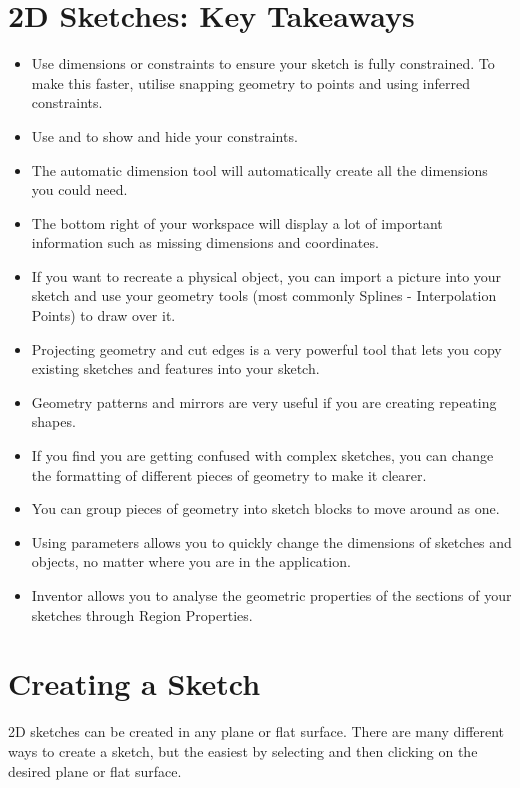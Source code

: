\section{2D Sketches: Key Takeaways}
\begin{itemize}
\cbstart
{}
\item Use dimensions or constraints to ensure your sketch is fully constrained. To make this faster, utilise snapping geometry to points and using inferred constraints.
\item Use  and  to show and hide your constraints.
\item The automatic dimension tool will automatically create all the dimensions you could need.
\item The bottom right of your workspace will display a lot of important information such as missing dimensions and coordinates.
\item If you want to recreate a physical object, you can import a picture into your sketch and use your geometry tools (most commonly Splines - Interpolation Points) to draw over it.
\item Projecting geometry and cut edges is a very powerful tool that lets you copy existing sketches and features into your sketch.
\item Geometry patterns and mirrors are very useful if you are creating repeating shapes.
\item If you find you are getting confused with complex sketches, you can change the formatting of different pieces of geometry to make it clearer.
\item You can group pieces of geometry into sketch blocks to move around as one.
\item Using parameters allows you to quickly change the dimensions of sketches and objects, no matter where you are in the application.
\item Inventor allows you to analyse the geometric properties of the sections of your sketches through Region Properties.
\cbend
\end{itemize}

\section{Creating a Sketch}

\cbstart
{}

2D sketches can be created in any plane or flat surface. There are many different ways to create a sketch, but the easiest by selecting  and then clicking on the desired plane or flat surface.
\cbend
